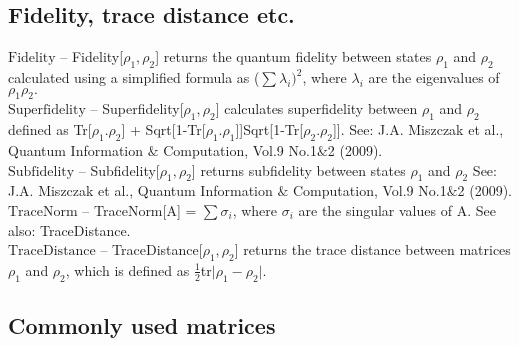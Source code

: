 \subsection{Fidelity, trace distance etc.}

\noindent\textbf{$ \text{Fidelity} $ }-- Fidelity[$ \rho _1,\rho _2 $] returns the quantum fidelity between states $ \rho _1 $ and $ \rho _2 $ calculated using a simplified formula as ($\sum $$ \lambda _i)^2 $, where $ \lambda _i $ are the eigenvalues of $ \rho _1\rho _2. $\\
\noindent\textbf{$ \text{Superfidelity} $ }-- Superfidelity[$ \rho _1,\rho _2 $] calculates superfidelity between $ \rho _1 $ and $ \rho _2 $ defined as Tr[$ \rho _1.\rho _2 $] + Sqrt[1-Tr[$ \rho _1.\rho _1 $]]Sqrt[1-Tr[$ \rho _2.\rho _2 $]]. See: J.A. Miszczak et al., Quantum Information $\&$ Computation, Vol.9 No.1$\&$2 (2009).$  $\\
\noindent\textbf{$ \text{Subfidelity} $ }-- Subfidelity[$ \rho _1,\rho _2 $] returns subfidelity between states $ \rho _1 $ and $ \rho _2 $ See: J.A. Miszczak et al., Quantum Information $\&$ Computation, Vol.9 No.1$\&$2 (2009).$  $\\
\noindent\textbf{$ \text{TraceNorm} $ }-- TraceNorm[A] = $\sum $$ \sigma _i $, where $ \sigma _i $ are the singular values of A. See also: TraceDistance.$  $\\
\noindent\textbf{$ \text{TraceDistance} $ }-- TraceDistance[$ \rho _1,\rho _2 $] returns the trace distance between matrices $ \rho _1 $ and $ \rho _2 $, which is defined as $ \frac{1}{2} $tr$|$$ \rho _1-\rho _2\text{$|$.} $\\
\subsection{Commonly used matrices}

